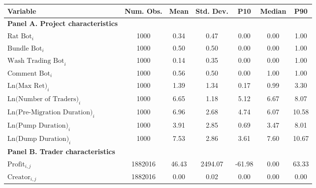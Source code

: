 \begin{tabular}{lcccccc}
\hline
Variable & Num. Obs. & Mean & Std. Dev. & P10 & Median & P90 \\
\hline
\textbf{Panel A. Project characteristics} \\
$\text{Rat Bot}_{i}$ & 1000 & 0.34 & 0.47 & 0.00 & 0.00 & 1.00 \\
$\text{Bundle Bot}_{i}$ & 1000 & 0.50 & 0.50 & 0.00 & 0.00 & 1.00 \\
$\text{Wash Trading Bot}_{i}$ & 1000 & 0.14 & 0.35 & 0.00 & 0.00 & 1.00 \\
$\text{Comment Bot}_{i}$ & 1000 & 0.56 & 0.50 & 0.00 & 1.00 & 1.00 \\
$\text{Ln(Max Ret)}_{i}$ & 1000 & 1.39 & 1.34 & 0.17 & 0.99 & 3.30 \\
$\text{Ln(Number of Traders)}_{i}$ & 1000 & 6.65 & 1.18 & 5.12 & 6.67 & 8.07 \\
$\text{Ln(Pre-Migration Duration)}_{i}$ & 1000 & 6.96 & 2.68 & 4.74 & 6.07 & 10.58 \\
$\text{Ln(Pump Duration)}_{i}$ & 1000 & 3.91 & 2.85 & 0.69 & 3.47 & 8.01 \\
$\text{Ln(Dump Duration)}_{i}$ & 1000 & 7.53 & 2.86 & 3.61 & 7.60 & 10.67 \\
\addlinespace
\textbf{Panel B. Trader characteristics} \\
$\text{Profit}_{i,j}$ & 1882016 & 46.43 & 2494.07 & -61.98 & 0.00 & 63.33 \\
$\text{Creator}_{i,j}$ & 1882016 & 0.00 & 0.02 & 0.00 & 0.00 & 0.00 \\
\hline
\end{tabular}